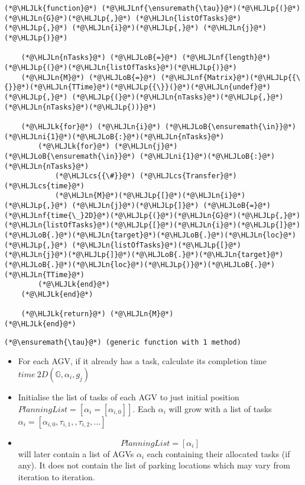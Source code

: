 \documentclass[12pt,a4paper]{article}
\newcommand{\HLJLk}[1]{\textcolor[RGB]{148,91,176}{\textbf{#1}}}
\newcommand{\HLJLn}[1]{#1}
\newcommand{\HLJLnf}[1]{\textcolor[RGB]{66,102,213}{#1}}
\newcommand{\HLJLni}[1]{\textcolor[RGB]{59,151,46}{#1}}
\newcommand{\HLJLoB}[1]{\textcolor[RGB]{102,102,102}{\textbf{#1}}}
\newcommand{\HLJLp}[1]{#1}
\newcommand{\HLJLcs}[1]{\textcolor[RGB]{153,153,119}{\textit{#1}}}
\begin{document}
\begin{lstlisting}
(*@\HLJLk{function}@*) (*@\HLJLnf{\ensuremath{\tau}}@*)(*@\HLJLp{(}@*)(*@\HLJLn{G}@*)(*@\HLJLp{,}@*) (*@\HLJLn{listOfTasks}@*)(*@\HLJLp{,}@*) (*@\HLJLn{i}@*)(*@\HLJLp{,}@*) (*@\HLJLn{j}@*)(*@\HLJLp{)}@*)

    (*@\HLJLn{nTasks}@*) (*@\HLJLoB{=}@*) (*@\HLJLnf{length}@*)(*@\HLJLp{(}@*)(*@\HLJLn{listOfTasks}@*)(*@\HLJLp{)}@*)
    (*@\HLJLn{M}@*) (*@\HLJLoB{=}@*) (*@\HLJLnf{Matrix}@*)(*@\HLJLp{{\{}}@*)(*@\HLJLn{TTime}@*)(*@\HLJLp{{\}}(}@*)(*@\HLJLn{undef}@*)(*@\HLJLp{,}@*) (*@\HLJLp{(}@*)(*@\HLJLn{nTasks}@*)(*@\HLJLp{,}@*) (*@\HLJLn{nTasks}@*)(*@\HLJLp{))}@*)

    (*@\HLJLk{for}@*) (*@\HLJLn{i}@*) (*@\HLJLoB{\ensuremath{\in}}@*) (*@\HLJLni{1}@*)(*@\HLJLoB{:}@*)(*@\HLJLn{nTasks}@*)
        (*@\HLJLk{for}@*) (*@\HLJLn{j}@*) (*@\HLJLoB{\ensuremath{\in}}@*) (*@\HLJLni{1}@*)(*@\HLJLoB{:}@*)(*@\HLJLn{nTasks}@*)
            (*@\HLJLcs{{\#}}@*) (*@\HLJLcs{Transfer}@*) (*@\HLJLcs{time}@*)
            (*@\HLJLn{M}@*)(*@\HLJLp{[}@*)(*@\HLJLn{i}@*)(*@\HLJLp{,}@*) (*@\HLJLn{j}@*)(*@\HLJLp{]}@*) (*@\HLJLoB{=}@*) (*@\HLJLnf{time{\_}2D}@*)(*@\HLJLp{(}@*)(*@\HLJLn{G}@*)(*@\HLJLp{,}@*) (*@\HLJLn{listOfTasks}@*)(*@\HLJLp{[}@*)(*@\HLJLn{i}@*)(*@\HLJLp{]}@*)(*@\HLJLoB{.}@*)(*@\HLJLn{target}@*)(*@\HLJLoB{.}@*)(*@\HLJLn{loc}@*)(*@\HLJLp{,}@*) (*@\HLJLn{listOfTasks}@*)(*@\HLJLp{[}@*)(*@\HLJLn{j}@*)(*@\HLJLp{]}@*)(*@\HLJLoB{.}@*)(*@\HLJLn{target}@*)(*@\HLJLoB{.}@*)(*@\HLJLn{loc}@*)(*@\HLJLp{)}@*)(*@\HLJLoB{.}@*)(*@\HLJLn{TTime}@*)
        (*@\HLJLk{end}@*)
    (*@\HLJLk{end}@*)

    (*@\HLJLk{return}@*) (*@\HLJLn{M}@*)
(*@\HLJLk{end}@*)
\end{lstlisting}

\begin{lstlisting}
(*@\ensuremath{\tau}@*) (generic function with 1 method)
\end{lstlisting}


\begin{itemize}
\item For each AGV, if it already has a task, calculate its completion time $time\ 2D(\mathbb{G}, \alpha_i, g_j)$


\item Initialise the list of tasks of each AGV to just initial position $PlanningList = [\alpha_i=[\alpha_{i, 0}]]$. Each $\alpha_i$ will grow with a list of tasks $\alpha_i = [\alpha_{i, 0}, \tau_{i, 1}, , \tau_{i, 2}, ...]$


\item \[
PlanningList = [\alpha_i]
\]
will later contain a list of AGVs $\alpha_i$ each containing their allocated tasks (if any). It does not contain the list of parking locations which may vary from iteration to iteration.

\end{itemize}
\end{document}
